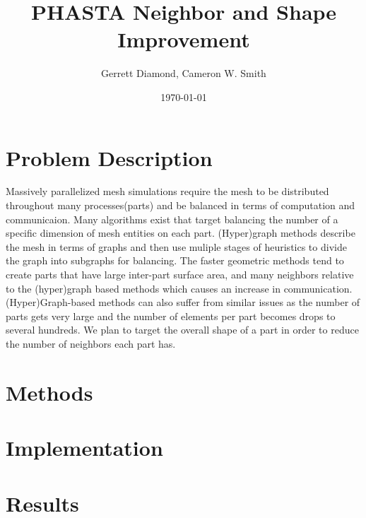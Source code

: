 \documentclass[a4paper]{article}
\title{PHASTA Neighbor and Shape Improvement}
\author{Gerrett Diamond, Cameron W. Smith}
\date{\today}
\begin{document}
\maketitle

\section{Problem Description}

Massively parallelized mesh simulations require the mesh to be distributed throughout many processes(parts) and be balanced in terms of computation and communicaion. Many algorithms exist that target balancing the number of a specific dimension of mesh entities on each part. (Hyper)graph methods describe the mesh in terms of graphs and then use muliple stages of heuristics to divide the graph into subgraphs for balancing. The faster geometric methods tend to create parts that have large inter-part surface area, and many neighbors relative to the (hyper)graph based methods which causes an increase in communication. (Hyper)Graph-based methods can also suffer from similar issues as the number of parts gets very large and the number of elements per part becomes drops to several hundreds.  We plan to target the overall shape of a part in order to reduce the number of neighbors each part has.  
 
\section{Methods}

\section{Implementation}

\section{Results}


\newpage


\end{document}
